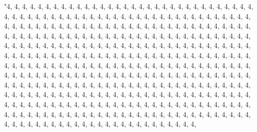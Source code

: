 \documentclass[
]{article}
\begin{document}
\begin{Schunk}
\begin{Soutput}
                                                                                                                                                                                                                                                                                                                                                                                                                                                                                                                                                                                                                                                                                                                                                                                                                                                                                                                                                                                                                                                                                                                                                                                                                                                                                                                                                                                                                                                                                                                                                                                                                                                                                                                                                                                                                                                                                                                                                                                                                                                                                                                                                            "4, 4, 4, 4, 4, 4, 4, 4, 4, 4, 4, 4, 4, 4, 4, 4, 4, 4, 4, 4, 4, 4, 4, 4, 4, 4, 4, 4, 4, 4, 4, 4, 4, 4, 4, 4, 4, 4, 4, 4, 4, 4, 4, 4, 4, 4, 4, 4, 4, 4, 4, 4, 4, 4, 4, 4, 4, 4, 4, 4, 4, 4, 4, 4, 4, 4, 4, 4, 4, 4, 4, 4, 4, 4, 4, 4, 4, 4, 4, 4, 4, 4, 4, 4, 4, 4, 4, 4, 4, 4, 4, 4, 4, 4, 4, 4, 4, 4, 4, 4, 4, 4, 4, 4, 4, 4, 4, 4, 4, 4, 4, 4, 4, 4, 4, 4, 4, 4, 4, 4, 4, 4, 4, 4, 4, 4, 4, 4, 4, 4, 4, 4, 4, 4, 4, 4, 4, 4, 4, 4, 4, 4, 4, 4, 4, 4, 4, 4, 4, 4, 4, 4, 4, 4, 4, 4, 4, 4, 4, 4, 4, 4, 4, 4, 4, 4, 4, 4, 4, 4, 4, 4, 4, 4, 4, 4, 4, 4, 4, 4, 4, 4, 4, 4, 4, 4, 4, 4, 4, 4, 4, 4, 4, 4, 4, 4, 4, 4, 4, 4, 4, 4, 4, 4, 4, 4, 4, 4, 4, 4, 4, 4, 4, 4, 4, 4, 4, 4, 4, 4, 4, 4, 4, 4, 4, 4, 4, 4, 4, 4, 4, 4, 4, 4, 4, 4, 4, 4, 4, 4, 4, 4, 4, 4, 4, 4, 4, 4, 4, 4, 4, 4, 4, 4, 4, 4, 4, 4, 4, 4, 4, 4, 4, 4, 4, 4, 4, 4, 4, 4, 4, 4, 4, 4, 4, 4, 4, 4, 4, 4, 4, 4, 4, 4, 4, 4, 4, 4, 4, 4, 4, 4, 4, 4, 4, 4, 4, 4, 4, 4, 4, 4, 4, 4, 4, 4, 4, 4, 4, 4, 4, 4, 4, 4, 4, 4, 4, 4, 4, 4, 4, 4, 4, 4, 4, 4, 4, 4, 4, 4, 4, 4, 4, 4, 4, 4, 4, 4, 4, 4, 4, 4, 4, 4, 4, 4, 4, 4, 4, 4, 4, 4, 4, 4, 4, 4, 4, 4, 4, 4, 4, 4, 4, 4, 4, 4, 4, 4, 4, 4, 4, 4, 4, 4, 4, 4, 4, 4, 4, 4, 4, 4, 4, 4, 4, 4, 4, 4, 4, 4, 4, 4, 4, 4, 4, 4, 4, 4, 4, 4, 4, 4, 4, 4, 4, 4, 4, 4, 4, 
\end{Soutput}
\end{Schunk}
\end{document}
